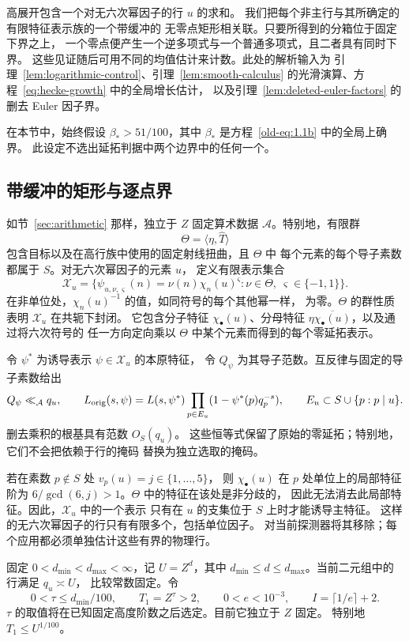 \documentclass[11pt,a4paper]{article}
\numberwithin{equation}{section}
\numberwithin{figure}{section}
\theoremstyle{definition}
\theoremstyle{remark}
\begin{document}
高展开包含一个对无六次幂因子的行 \(u\) 的求和。
我们把每个非主行与其所确定的有限特征表示族的一个带缓冲的
无零点矩形相关联。只要所得到的分箱位于固定下界之上，
一个零点便产生一个逆多项式与一个普通多项式，且二者具有同时下界。
这些见证随后可用不同的均值估计来计数。此处的解析输入为
引理~\ref{lem:logarithmic-control}、引理~\ref{lem:smooth-calculus}
的光滑演算、方程~\eqref{eq:hecke-growth} 中的全局增长估计，
以及引理~\ref{lem:deleted-euler-factors} 的删去 Euler 因子界。

在本节中，始终假设 \(\beta_*>51/100\)，其中 \(\beta_*\)
是方程~\eqref{old-eq:1.1b} 中的全局上确界。
此设定不选出延拓判据中两个边界中的任何一个。

\subsection{带缓冲的矩形与逐点界}

如节~\ref{sec:arithmetic} 那样，独立于 \(Z\) 固定算术数据
\(\mathcal A\)。特别地，有限群
\[
 \Theta=\langle\eta,\widehat T\rangle
\]
包含目标以及在高行族中使用的固定射线扭曲，且 \(\Theta\) 中
每个元素的每个导子素数都属于 \(S\)。对无六次幂因子的元素 \(u\)，
定义有限表示集合
\[
 \mathcal X_u=
 \bigl\{\psi_{u,\nu,\varsigma}(n)=\nu(n)\chi_n(u)^\varsigma:
       \nu\in\Theta,\ \varsigma\in\{-1,1\}\bigr\}.
\]
在非单位处，\(\chi_n(u)^{-1}\) 的值，如同符号的每个其他幂一样，
为零。\(\Theta\) 的群性质表明 \(\mathcal X_u\) 在共轭下封闭。
它包含分子特征 \(\chi_\bullet(u)\)、分母特征
\(\eta\overline{\chi_\bullet(u)}\)，以及通过将六次符号的
任一方向定向乘以 \(\Theta\) 中某个元素而得到的每个零延拓表示。

令 \(\psi^*\) 为诱导表示 \(\psi\in\mathcal X_u\) 的本原特征，
令 \(Q_\psi\) 为其导子范数。互反律与固定的导子素数给出
\[
 Q_\psi\ll_{\mathcal A}q_u,\qquad
 L_{\rm orig}(s,\psi)
   =L(s,\psi^*)\prod_{p\in E_u}(1-\psi^*(p)q_p^{-s}),
 \qquad
 E_u\subset S\cup\{p:p\mid u\}.
\]
删去乘积的根基具有范数 \(O_S(q_u)\)。
这些恒等式保留了原始的零延拓；特别地，它们不会把依赖于行的掩码
替换为独立选取的掩码。

\label{par:physical-row-ramification}
若在素数 \(p\notin S\) 处 \(v_p(u)=j\in\{1,\ldots,5\}\)，
则 \(\chi_\bullet(u)\) 在 \(p\) 处单位上的局部特征阶为
\(6/\gcd(6,j)>1\)。\(\Theta\) 中的特征在该处是非分歧的，
因此无法消去此局部特征。因此，\(\mathcal X_u\) 中的一个表示
只有在 \(u\) 的支集位于 \(S\) 上时才能诱导主特征。
这样的无六次幂因子的行只有有限多个，包括单位因子。
对当前探测器将其移除；每个应用都必须单独估计这些有界的物理行。

固定 \(0<d_{\min}<d_{\max}<\infty\)，记 \(U=Z^d\)，其中
\(d_{\min}\le d\le d_{\max}\)。当前二元组中的行满足 \(q_u\asymp U\)，
比较常数固定。令
\[
 0<\tau\le d_{\min}/100,\qquad T_1=Z^\tau>2,\qquad
 0<e<10^{-3},\qquad I=\lceil1/e\rceil+2.
\]
\(\tau\) 的取值将在已知固定高度阶数之后选定。目前它独立于 \(Z\) 固定。
特别地 \(T_1\le U^{1/100}\)。
\end{document}
